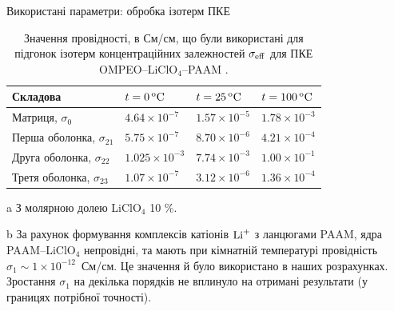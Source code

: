 \documentclass[10pt]{beamer}
\begin{document}
\begin{frame}{Використані параметри: обробка ізотерм ПКЕ}
\footnotesize

\begin{table}[tb]
	\centering
	\begin{threeparttable}
		\caption{\label{tab:isotherms} Значення провідності, в См/см, що були використані для підгонок ізотерм концентраційних залежностей $\sigma_{\rm{eff}}$ для ПКЕ OMPEO--LiClO$_4$--PAAM . }
		
		\begin{tabular}{|l|l|l|l|}
			\hline
			{Складова}   & $t = 0\,\rm { ^oC}$ & $t = 25\, \rm {^oC}$ & $t = 100\, \rm {^oC}$ \\
			\hline
			Матриця, $\sigma_0$           &  $4.64\times 10^{-7}$  &  $1.57\times 10^{-5}$  &  $1.78\times 10^{-3}$   \\
			Перша оболонка, $\sigma_{21}$   &  $5.75\times 10^{-7}$  &  $8.70\times 10^{-6}$  &  $4.21\times 10^{-4}$    \\
			Друга оболонка, $\sigma_{22}$  &  $1.025\times 10^{-3}$ &  $7.74\times 10^{-3}$  &  $1.00\times 10^{-1}$   \\
			Третя оболонка, $\sigma_{23}$   &  $1.07\times 10^{-7}$  &  $3.12\times 10^{-6}$  &  $1.36\times 10^{-4}$ \\
			\hline
		\end{tabular}
		\begin{tablenotes}
			\item[a] З молярною долею LiClO$_4$ 10 \%. 
			\item[b] За рахунок формування комплексів катіонів $\rm{Li}^+ $
			з ланцюгами PAAM, ядра PAAM--LiClO$_4$ непровідні, та мають
			при кімнатній температурі провідність 
			$\sigma_1\sim 1\times 10^{-12}$~См/см. 
			Це значення й було використано в наших розрахунках.
			Зростання $\sigma_1$ на декілька порядків не вплинуло
			на отримані результати (у границях потрібної точності).
		\end{tablenotes}
	\end{threeparttable}
\end{table}

\end{frame}
\end{document}
